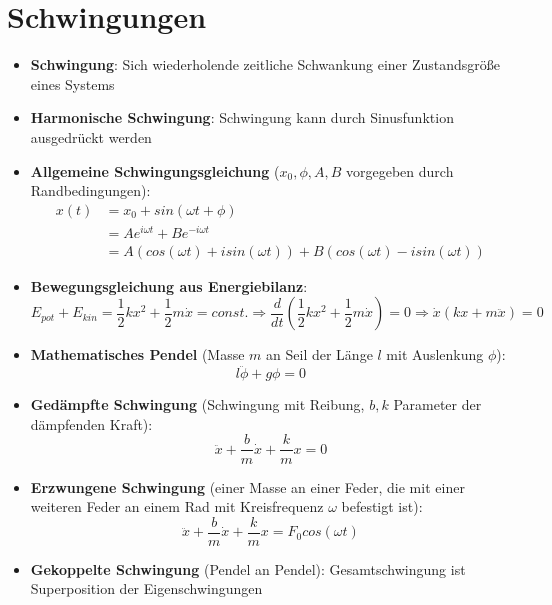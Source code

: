 \section{Schwingungen}%
\label{schwing:sec:schwingungen}

\begin{itemize}
	\item \textbf{Schwingung}: Sich wiederholende zeitliche Schwankung einer Zustandsgröße eines Systems
	\item \textbf{Harmonische Schwingung}: Schwingung kann durch Sinusfunktion ausgedrückt werden
	\item \textbf{Allgemeine Schwingungsgleichung} ($x_0, \phi, A, B$ vorgegeben durch Randbedingungen):
	\begin{align*}
		x(t) &= x_0 + sin(\omega t + \phi)\\
			 &= Ae^{i\omega t} + Be^{-i\omega t}\\
			 &= A(cos(\omega t) + isin(\omega t)) + B(cos(\omega t) - isin(\omega t))
	\end{align*}
	\item \textbf{Bewegungsgleichung aus Energiebilanz}:
	\begin{equation}
		E_{pot} + E_{kin} = \frac{1}{2}kx^2 + \frac{1}{2}m\dot{x} = const. \Rightarrow \frac{d}{dt}(\frac{1}{2}kx^2 + \frac{1}{2}m\dot{x}) = 0 \Rightarrow \dot{x}(kx + m\ddot{x}) = 0
	\end{equation}
	\item \textbf{Mathematisches Pendel} (Masse $m$ an Seil der Länge $l$ mit Auslenkung $\phi$):
	\begin{equation}
		l\ddot{\phi} + g\phi = 0
	\end{equation}
	\item \textbf{Gedämpfte Schwingung} (Schwingung mit Reibung, $b, k$ Parameter der dämpfenden Kraft):
	\begin{equation}
		\ddot{x} + \frac{b}{m}\dot{x} + \frac{k}{m}x = 0
	\end{equation}
	\item \textbf{Erzwungene Schwingung} (einer Masse an einer Feder, die mit einer weiteren Feder an einem Rad mit Kreisfrequenz $\omega$ befestigt ist):
	\begin{equation}
		\ddot{x} + \frac{b}{m}\dot{x} + \frac{k}{m}x = F_0cos(\omega t)
	\end{equation}
	\item \textbf{Gekoppelte Schwingung} (Pendel an Pendel): Gesamtschwingung ist Superposition der Eigenschwingungen
\end{itemize}
